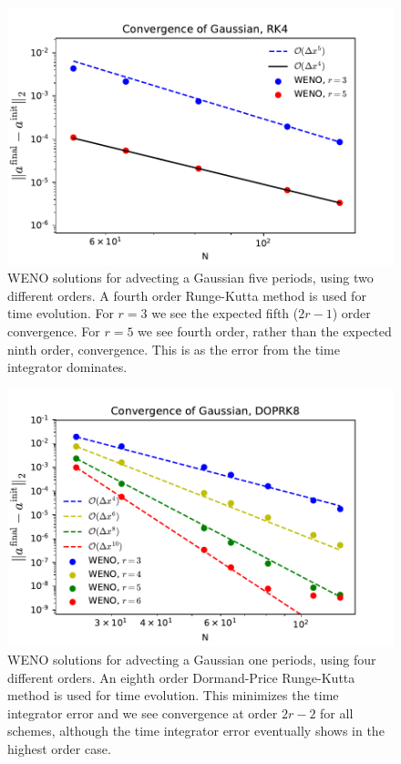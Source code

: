 \begin{figure}[t]
\centering
\includegraphics[width=0.8\linewidth]{weno-converge-gaussian-rk4}
\caption[High order WENO convergence rates for linear advection]
{\label{fig:weno-converge-gaussian-rk4} WENO solutions for advecting a Gaussian five periods, using two different orders. A fourth order Runge-Kutta method is used for time evolution. For $r=3$ we see the expected fifth ($2 r - 1$) order convergence. For $r=5$ we see fourth order, rather than the expected ninth order, convergence. This is as the error from the time integrator dominates. \\
}
\end{figure}
%

\begin{figure}[t]
\centering
\includegraphics[width=0.8\linewidth]{weno-converge-gaussian}
\caption[Very high order WENO convergence rates for linear advection]
{\label{fig:weno-converge-gaussian} WENO solutions for advecting a Gaussian one periods, using four different orders. An eighth order Dormand-Price Runge-Kutta method is used for time evolution. This minimizes the time integrator error and we see convergence at order $2 r - 2$ for all schemes, although the time integrator error eventually shows in the highest order case. \\
}
\end{figure}
%

